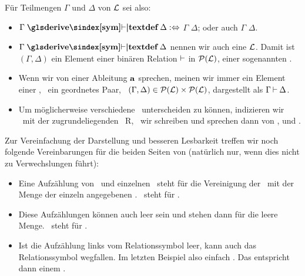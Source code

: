 Für Teilmengen $\Gamma$ und $\Delta$ von $\mathcal{L}$ sei also:
\begin{itemize}
	\item $\Gamma \opdefinition{\symderive} \Delta \metadefeq$ $\Gamma$  $\Delta$; oder auch $\Gamma$  $\Delta$.
	\item $\Gamma \opdefinition{\symderive} \Delta$ nennen wir auch eine   $\mathcal{L}$.
	Damit ist $(\Gamma,\Delta)$ ein Element einer binären Relation $\mathbin{\vdash}$ in $\mathcal{P}(\mathcal{L})$, einer sogenannten .
	\item Wenn wir von einer Ableitung $\mathbf{a}$ sprechen, meinen wir immer ein Element einer \Ableitungsrelation, \textdh\ ein geordnetes Paar, \textzB\ $(\Gamma, \Delta) \in \mathcal{P}(\mathcal{L}) \times \mathcal{P}(\mathcal{L})$, dargestellt als $\Gamma \derive \Delta$.
	\item Um möglicherweise verschiedene \Ableitungsrelationen\ unterscheiden zu können, indizieren wir  \textggf\ mit der zugrundeliegenden \Relation\ R, \textdh\ wir schreiben  und sprechen dann von ,  und .
\end{itemize}
%
Zur Vereinfachung der Darstellung und besseren Lesbarkeit treffen wir noch folgende Vereinbarungen für die beiden Seiten von \seqqt{$\Gamma \derive \Delta$} (natürlich nur, wenn dies nicht zu Verwechslungen führt):
\begin{itemize}
	\item Eine Aufzählung von \Formelmengen\ und einzelnen \Formeln\ steht für die Vereinigung der \Formelmengen\ mit der Menge der einzeln angegebenen \Formeln.
	\textZB\ steht \seqqt{$\Gamma,\alpha \derive \beta$} für \seqqt{$(\Gamma \cup \{\alpha\}) \derive \{\beta\}$}.
	\item Diese Aufzählungen können auch leer sein und stehen dann für die leere Menge. \textZB\ steht \seqqt{$\derive\; \alpha \limp (\beta \limp \alpha)$} für \seqqt{$\emptyset \derive \{\alpha \limp (\beta \limp \alpha)\}$}.
	\item Ist die Aufzählung links vom Relationssymbol \chrqt{\symderive} leer, kann auch das Relationssymbol wegfallen. Im letzten Beispiel also einfach \seqqt{$\{\alpha \limp (\beta \limp \alpha)\}$}. Das entspricht dann einem .
\end{itemize}
